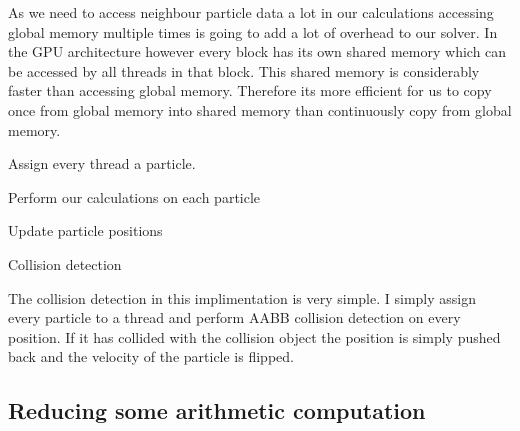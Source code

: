 \begin{DoxyEnumerate}
\begin{DoxyEnumerate}
 As we need to access neighbour particle data a lot in our calculations accessing global memory multiple times is going to add a lot of overhead to our solver. In the G\-P\-U architecture however every block has its own shared memory which can be accessed by all threads in that block. This shared memory is considerably faster than accessing global memory. Therefore its more efficient for us to copy once from global memory into shared memory than continuously copy from global memory.
\item Assign every thread a particle.
\item Perform our calculations on each particle
\item Update particle positions
\end{DoxyEnumerate}
\item Collision detection\par
 The collision detection in this implimentation is very simple. I simply assign every particle to a thread and perform A\-A\-B\-B collision detection on every position. If it has collided with the collision object the position is simply pushed back and the velocity of the particle is flipped.
\end{DoxyEnumerate}

\subsection*{Reducing some arithmetic computation }

